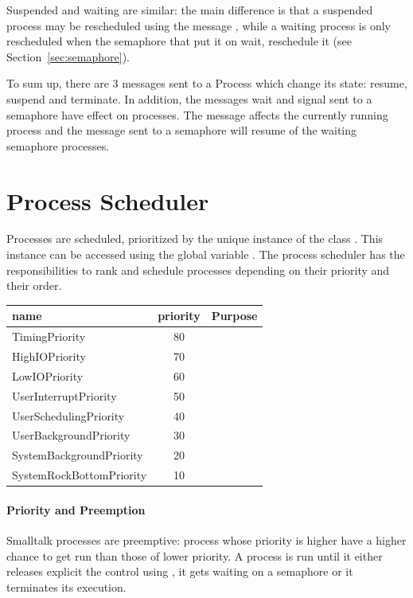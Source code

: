 \documentclass[a4paper,10pt,twoside]{book}
\begin{document}
Suspended and waiting are similar: the main difference is that a suspended process may be rescheduled using the message , while a waiting process is only rescheduled when the semaphore that put it on wait, reschedule it (see Section~\ref{sec:semaphore}).

To sum up, there are 3 messages sent to a Process which change its state: resume, suspend and terminate. In addition, the messages wait and signal sent to a semaphore have effect on processes. The message  affects the currently running process and the message  sent to a semaphore will resume of the waiting semaphore processes. 


\section{Process Scheduler}

Processes are scheduled, \ie prioritized by the unique instance of the class . This instance can be accessed using the global variable
. The process scheduler has the responsibilities to rank and schedule processes depending on their priority and their order.

\begin{table}
\begin{tabular}{l|c|c}
	name& priority & Purpose\\ \hline
	TimingPriority&80&\\ 
	HighIOPriority&70&\\ 
	LowIOPriority&60&\\ 
	UserInterruptPriority&50&\\
	UserSchedulingPriority&40\\
	UserBackgroundPriority&30&\\ 
	SystemBackgroundPriority&20&\\ 
	SystemRockBottomPriority&10&\\ \hline
\end{tabular}
\end{table}

\paragraph{Priority and Preemption}
Smalltalk processes are preemptive: process whose priority is higher have a higher chance to get run than those of lower priority. A process is run until it either releases explicit the control using , it gets waiting on a semaphore or it terminates its execution. 
\end{document}

